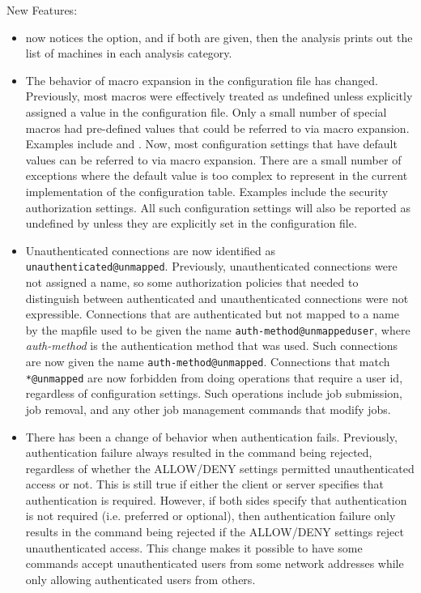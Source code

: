 \noindent New Features:

\begin{itemize}

\item {}  now notices the  option, and if both
are given, then the analysis prints out the list of machines
in each analysis category.

\item The behavior of macro expansion in the configuration file has
  changed.  Previously, most macros were effectively treated as
  undefined unless explicitly assigned a value in the configuration
  file.  Only a small number of special macros had pre-defined values
  that could be referred to via macro expansion.  Examples include
   and .  Now, most
  configuration settings that have default values can be referred to
  via macro expansion.  There are a small number of exceptions where
  the default value is too complex to represent in the current
  implementation of the configuration table.  Examples include the
  security authorization settings. All such configuration settings
  will also be reported as undefined by  unless
  they are explicitly set in the configuration file.

\item Unauthenticated connections are now identified as
  \verb|unauthenticated@unmapped|.  Previously, unauthenticated
  connections were not assigned a name, so some authorization policies
  that needed to distinguish between authenticated and unauthenticated
  connections were not expressible.  Connections that are
  authenticated but not mapped to a name by the mapfile used to be
  given the name \verb|auth-method@unmappeduser|, where
  \emph{auth-method} is the authentication method that was used.  Such
  connections are now given the name \verb|auth-method@unmapped|.
  Connections that match \verb|*@unmapped| are now forbidden from
  doing operations that require a user id, regardless of configuration
  settings.  Such operations include job submission, job removal, and
  any other job management commands that modify jobs.

\item There has been a change of behavior when authentication fails.
  Previously, authentication failure always resulted in the command
  being rejected, regardless of whether the ALLOW/DENY settings
  permitted unauthenticated access or not.  This is still true if either
  the client or server specifies that authentication is required.
  However, if both sides specify that authentication is not required
  (i.e. preferred or optional), then authentication failure only results
  in the command being rejected if the ALLOW/DENY settings reject
  unauthenticated access.  This change makes it possible to have some
  commands accept unauthenticated users from some network addresses
  while only allowing authenticated users from others.


\end{itemize}
